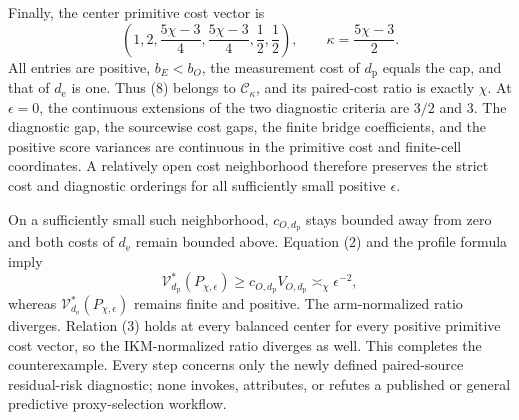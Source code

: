 Finally, the center primitive cost vector is
\[
 \left(1,2,\frac{5\chi-3}{4},\frac{5\chi-3}{4},\frac12,\frac12\right),
 \qquad \kappa=\frac{5\chi-3}{2}.                            \tag{8}
\]
All entries are positive, \(b_E<b_O\), the measurement cost of \(d_{\mathrm p}\) equals the cap, and that of \(d_{\mathrm e}\) is one.  Thus (8) belongs to \(\mathcal C_\kappa\), and its paired-cost ratio is exactly \(\chi\).  At \(\epsilon=0\), the continuous extensions of the two diagnostic criteria are \(3/2\) and \(3\).  The diagnostic gap, the sourcewise cost gaps, the finite bridge coefficients, and the positive score variances are continuous in the primitive cost and finite-cell coordinates.  A relatively open cost neighborhood therefore preserves the strict cost and diagnostic orderings for all sufficiently small positive \(\epsilon\).

On a sufficiently small such neighborhood, \(c_{O,d_{\mathrm p}}\) stays bounded away from zero and both costs of \(d_{\mathrm e}\) remain bounded above.  Equation (2) and the profile formula imply
\[
 \mathcal V_{d_{\mathrm p}}^*(P_{\chi,\epsilon})
 \ge c_{O,d_{\mathrm p}}V_{O,d_{\mathrm p}}
 \asymp_\chi\epsilon^{-2},
\]
whereas \(\mathcal V_{d_{\mathrm e}}^*(P_{\chi,\epsilon})\) remains finite and positive.  The arm-normalized ratio diverges.  Relation (3) holds at every balanced center for every positive primitive cost vector, so the IKM-normalized ratio diverges as well.  This completes the counterexample.  Every step concerns only the newly defined paired-source residual-risk diagnostic; none invokes, attributes, or refutes a published or general predictive proxy-selection workflow.